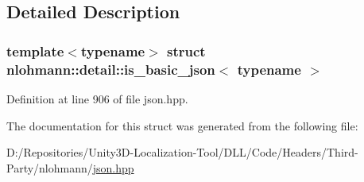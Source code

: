 \subsection{Detailed Description}
\subsubsection*{template$<$typename$>$\newline
struct nlohmann\+::detail\+::is\+\_\+basic\+\_\+json$<$ typename $>$}



Definition at line 906 of file json.\+hpp.



The documentation for this struct was generated from the following file\+:\begin{DoxyCompactItemize}
\item 
D\+:/\+Repositories/\+Unity3\+D-\/\+Localization-\/\+Tool/\+D\+L\+L/\+Code/\+Headers/\+Third-\/\+Party/nlohmann/\mbox{\hyperlink{json_8hpp}{json.\+hpp}}\end{DoxyCompactItemize}
